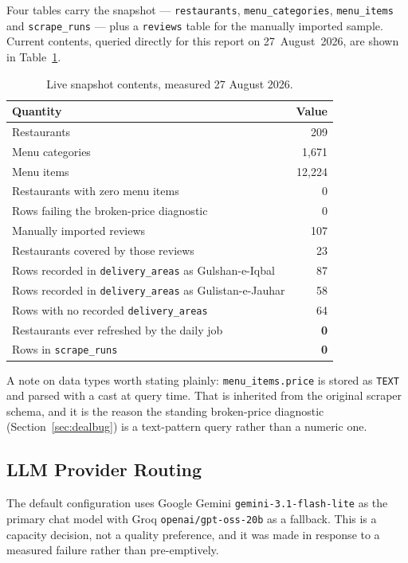 \documentclass[11pt,a4paper]{article}
\newcommand{\code}[1]{\texttt{\small #1}}
\begin{document}
Four tables carry the snapshot --- \code{restaurants}, \code{menu\_categories},
\code{menu\_items} and \code{scrape\_runs} --- plus a \code{reviews} table for
the manually imported sample. Current contents, queried directly for this
report on 27~August~2026, are shown in Table~\ref{tab:rows}.

\begin{table}[htbp]
\centering
\caption{Live snapshot contents, measured 27 August 2026.}
\label{tab:rows}
\small
\begin{tabular}{@{}l r@{}}
\toprule
\textbf{Quantity} & \textbf{Value} \\
\midrule
Restaurants & 209 \\
Menu categories & 1{,}671 \\
Menu items & 12{,}224 \\
Restaurants with zero menu items & 0 \\
Rows failing the broken-price diagnostic & 0 \\
Manually imported reviews & 107 \\
Restaurants covered by those reviews & 23 \\
Rows recorded in \code{delivery\_areas} as Gulshan-e-Iqbal & 87 \\
Rows recorded in \code{delivery\_areas} as Gulistan-e-Jauhar & 58 \\
Rows with no recorded \code{delivery\_areas} & 64 \\
Restaurants ever refreshed by the daily job & \textbf{0} \\
Rows in \code{scrape\_runs} & \textbf{0} \\
\bottomrule
\end{tabular}
\end{table}

A note on data types worth stating plainly: \code{menu\_items.price} is stored
as \code{TEXT} and parsed with a cast at query time. That is inherited from the
original scraper schema, and it is the reason the standing broken-price
diagnostic (Section~\ref{sec:dealbug}) is a text-pattern query rather than a
numeric one.

\subsection{LLM Provider Routing}

The default configuration uses Google Gemini \code{gemini-3.1-flash-lite} as
the primary chat model with Groq \code{openai/gpt-oss-20b} as a fallback. This
is a capacity decision, not a quality preference, and it was made in response
to a measured failure rather than pre-emptively.
\end{document}
